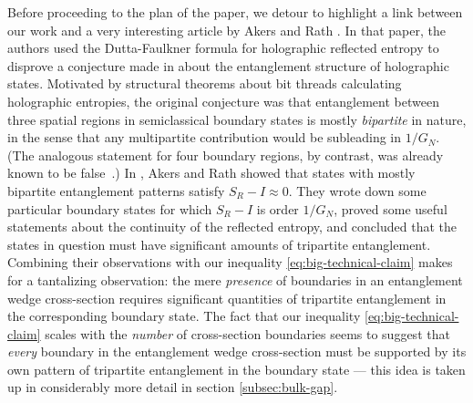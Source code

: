 \documentclass[a4paper,11pt]{article}
\begin{document}
Before proceeding to the plan of the paper, we detour to highlight a link between our work and a very interesting article by Akers and Rath \cite{akers-rath-tripartite}. In that paper, the authors used the Dutta-Faulkner formula for holographic reflected entropy to disprove a conjecture made in \cite{mostly-bipartite} about the entanglement structure of holographic states. Motivated by structural theorems about bit threads calculating holographic entropies, the original conjecture was that entanglement between three spatial regions in semiclassical boundary states is mostly \emph{bipartite} in nature, in the sense that any multipartite contribution would be subleading in $1/G_N$. (The analogous statement for four boundary regions, by contrast, was already known to be false~\cite{balasubramanian2014multiboundary}.) In \cite{akers-rath-tripartite}, Akers and Rath showed that states with mostly bipartite entanglement patterns satisfy $S_R - I \approx 0.$ They wrote down some particular boundary states for which $S_R - I$ is order $1/G_N$, proved some useful statements about the continuity of the reflected entropy, and concluded that the states in question must have significant amounts of tripartite entanglement. Combining their observations with our inequality \eqref{eq:big-technical-claim} makes for a tantalizing observation: the mere \textit{presence} of boundaries in an entanglement wedge cross-section requires significant quantities of tripartite entanglement in the corresponding boundary state. The fact that our inequality \eqref{eq:big-technical-claim} scales with the \emph{number} of cross-section boundaries seems to suggest that \emph{every} boundary in the entanglement wedge cross-section must be supported by its own pattern of tripartite entanglement in the boundary state --- this idea is taken up in considerably more detail in section \ref{subsec:bulk-gap}. 
\end{document}
